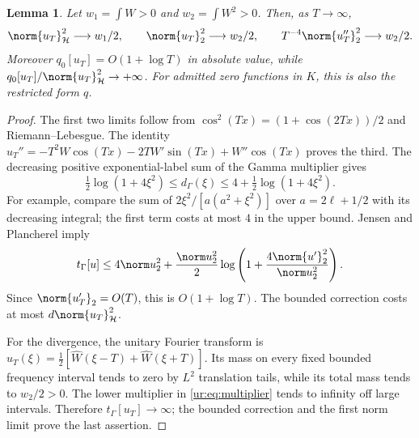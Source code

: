 \documentclass[11pt,a4paper]{article}
\numberwithin{equation}{section}
\newtheorem{lemma}[theorem]{Lemma}
\theoremstyle{definition}\newtheorem{definition}[theorem]{Definition}
\theoremstyle{remark}\newtheorem{remark}[theorem]{Remark}
\newcommand{\Hh}{\mathcal H}\newcommand{\Hw}{\mathcal H}
\begin{document}
\begin{lemma}\label{ur:lem:asympt}
Let $w_1=\int W>0$ and $w_2=\int W^2>0$. Then, as $T\to\infty$,
\[
 \norm{u_T}_\Hh^2\longrightarrow w_1/2,\qquad
 \norm{u_T}_2^2\longrightarrow w_2/2,\qquad
 T^{-4}\norm{u_T''}_2^2\longrightarrow w_2/2.
\]
Moreover $q_0[u_T]=O(1+\log T)$ in absolute value, while
$q_0[u_T]/\norm{u_T}_\Hh^2\to+\infty$.
For admitted zero functions in $K$, this is also the restricted form $q$.
\end{lemma}
\begin{proof}
The first two limits follow from $\cos^2(Tx)=(1+\cos(2Tx))/2$ and
Riemann--Lebesgue. The identity
$u_T''=-T^2W\cos(Tx)-2TW'\sin(Tx)+W''\cos(Tx)$ proves the third.
The decreasing positive exponential-label sum of the Gamma multiplier
gives
\begin{equation}\label{ur:eq:multiplier}
 \tfrac12\log(1+4\xi^2)\le d_\Gamma(\xi)
 \le4+\tfrac12\log(1+4\xi^2).
\end{equation}
For example, compare the sum of
$2\xi^2/[a(a^2+\xi^2)]$ over $a=2\ell+1/2$ with its decreasing
integral; the first term costs at most $4$ in the upper bound.
Jensen and Plancherel imply
\[
 t_\Gamma[u]\le4\norm u_2^2+
 \frac{\norm u_2^2}{2}
 \log\left(1+\frac{4\norm{u'}_2^2}{\norm u_2^2}\right).
\]
Since $\norm{u_T'}_2=O(T)$, this is $O(1+\log T)$.
The bounded correction costs at most $d\norm{u_T}_\Hh^2$.

For the divergence, the unitary Fourier transform is
$\widehat u_T(\xi)=\tfrac12[\widehat W(\xi-T)+\widehat W(\xi+T)]$.
Its mass on every fixed bounded frequency interval tends to zero by
$L^2$ translation tails, while its total mass tends to $w_2/2>0$.
The lower multiplier in \eqref{ur:eq:multiplier} tends to infinity off
large intervals. Therefore $t_\Gamma[u_T]\to\infty$; the bounded
correction and the first norm limit prove the last assertion.
\end{proof}
\end{document}
